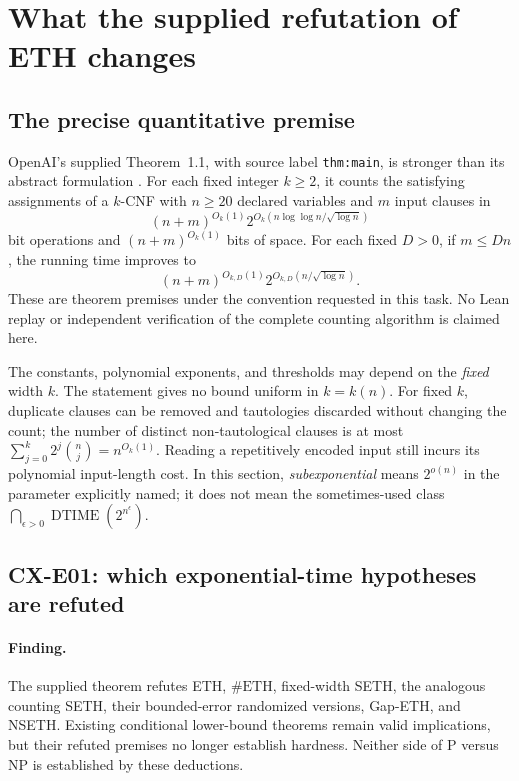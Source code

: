 \documentclass[11pt,a4paper]{article}
\begin{document}
\section{What the supplied refutation of ETH changes}
\label{sec:eth}

\subsection{The precise quantitative premise}

OpenAI's supplied Theorem~1.1, with source label
\texttt{thm:main}, is stronger than its abstract formulation
\cite[Theorem~1.1]{OpenAIETH}.
For each fixed integer \(k\geq2\), it counts the satisfying assignments of a
\(k\)-CNF with \(n\geq20\) declared variables and \(m\) input clauses in
\[
 (n+m)^{O_k(1)}
 2^{O_k(n\log\log n/\sqrt{\log n})}
\]
bit operations and \((n+m)^{O_k(1)}\) bits of space.
For each fixed \(D>0\), if \(m\leq Dn\), the running time improves to
\[
 (n+m)^{O_{k,D}(1)}2^{O_{k,D}(n/\sqrt{\log n})}.
\]
These are theorem premises under the convention requested in this task.
No Lean replay or independent verification of the complete counting
algorithm is claimed here.

The constants, polynomial exponents, and thresholds may depend on the
\emph{fixed} width \(k\). The statement gives no bound uniform in
\(k=k(n)\). For fixed \(k\), duplicate clauses can be removed and
tautologies discarded without changing the count; the number of distinct
non-tautological clauses is at most
\(\sum_{j=0}^{k}2^j\binom nj=n^{O_k(1)}\).
Reading a repetitively encoded input still incurs its polynomial
input-length cost. In this section, \emph{subexponential} means
\(2^{o(n)}\) in the parameter explicitly named; it does not mean the
sometimes-used class
\(\bigcap_{\epsilon>0}\operatorname{DTIME}(2^{n^\epsilon})\).

\subsection{CX-E01: which exponential-time hypotheses are refuted}
\label{finding:CX-E01}

\paragraph{Finding.}
The supplied theorem refutes ETH, \(\#\mathrm{ETH}\), fixed-width SETH,
the analogous counting SETH, their bounded-error randomized versions,
Gap-ETH, and NSETH. Existing conditional lower-bound theorems remain
valid implications, but their refuted premises no longer establish
hardness. Neither side of \(\mathrm P\) versus \(\mathrm{NP}\) is
established by these deductions.
\end{document}
